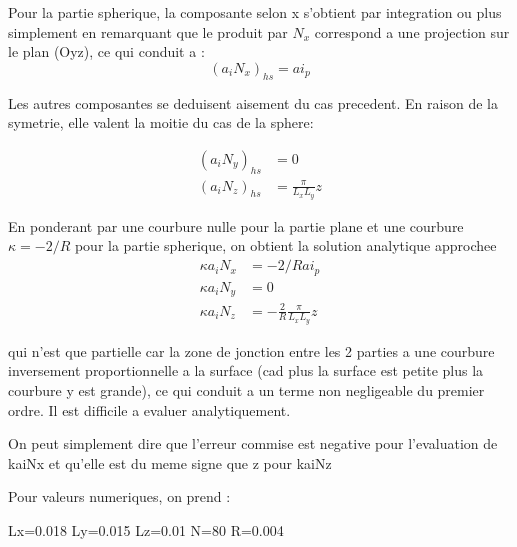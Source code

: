 Pour la partie spherique, la composante selon x s'obtient par integration ou plus simplement en remarquant que le
produit par $N_x$ correspond a une projection sur le plan (Oyz), ce qui conduit a : 
$$(a_iN_x)_{hs} = ai_p $$

Les autres composantes se deduisent aisement du cas precedent. En raison de la symetrie, elle valent la moitie du cas de la 
sphere:

\begin{subequations}
\begin{align}
  (a_iN_y)_{hs} &= 0 \\
  (a_iN_z)_{hs} &= \frac{\pi}{L_xL_y} z
\end{align}
\end{subequations}


En ponderant par une courbure nulle pour la partie plane et une courbure $\kappa = -2/R$ pour la partie spherique, on obtient 
la solution analytique approchee 
\begin{subequations}
\begin{align}
  \kappa a_iN_x &= -2/R ai_p \\
  \kappa a_iN_y &= 0  \\
  \kappa a_iN_z &= -\frac{2}{R} \frac{\pi}{L_xL_y} z
\end{align}
\end{subequations}

qui n'est que partielle car la zone de jonction entre les 2 parties a une courbure inversement proportionnelle a la surface
(cad plus la surface est petite plus la courbure y est grande), ce qui conduit a un terme non negligeable du premier ordre.
Il est difficile a evaluer analytiquement. 

On peut simplement dire que l'erreur commise est negative pour l'evaluation de kaiNx et qu'elle est du meme signe que z pour kaiNz


Pour valeurs numeriques, on prend : 

Lx=0.018
Ly=0.015
Lz=0.01
N=80
R=0.004
